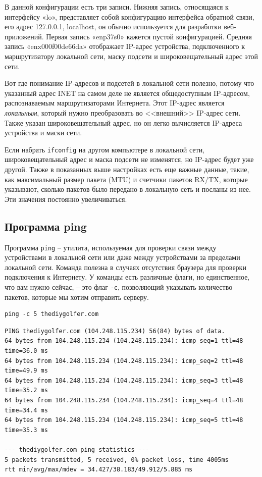 \documentclass[a4paper,12pt,final,openany]{extbook}
\begin{document}
В данной конфигурации есть три записи. Нижняя запись, относящаяся к
интерфейсу «lo», представляет собой конфигурацию интерфейса обратной
связи, его адрес 127.0.0.1, localhost, он обычно используется для
разработки веб-приложений. Первая запись «enp37s0» кажется пустой
конфигурацией. Средняя запись «enx000f00de66da» отображает IP-адрес
устройства, подключенного к маршрутизатору локальной сети, маску
подсети и широковещательный адрес этой сети.

Вот где понимание IP-адресов и
подсетей в локальной сети полезно, потому что указанный адрес INET на самом деле не является общедоступным IP-адресом, распознаваемым
маршрутизаторами Интернета. Этот IP-адрес является \emph{локальным},
который нужно преобразовать во <<внешний>> IP-адрес сети.
Также указан широковещательный адрес, но он легко
вычисляется IP-адреса устройства и маски сети.

Если набрать \texttt{ifconfig} на другом компьютере в локальной сети,
широковещательный адрес и маска подсети не изменятся, но IP-адрес будет уже
другой. Также в показанных выше настройках есть еще важные данные,
такие, как максимальный размер пакета (MTU)
и счетчики пакетов RX/TX, которые указывают, сколько пакетов было
передано в локальную сеть и посланы из нее. Эти значения постоянно
увеличиваться.

\hypertarget{ping}{%
\subsection{\texorpdfstring{\protect\hyperlink{ping}{}Программа
ping}{Программа ping}}\label{ping}}

Программа \texttt{ping} -- утилита, используемая для проверки
связи между устройствами в локальной сети или даже между устройствами за
пределами локальной сети. Команда полезна в случаях отсутствия браузера
для проверки подключения к Интернету. У команды есть различные флаги, но
единственное, что вам нужно сейчас, -- это флаг \texttt{-c},
позволяющий указывать количество пакетов, которые мы хотим отправить
серверу.
\begin{verbatim}
ping -c 5 thediygolfer.com
\end{verbatim}

\begin{verbatim}
PING thediygolfer.com (104.248.115.234) 56(84) bytes of data.
64 bytes from 104.248.115.234 (104.248.115.234): icmp_seq=1 ttl=48 time=36.0 ms
64 bytes from 104.248.115.234 (104.248.115.234): icmp_seq=2 ttl=48 time=49.9 ms
64 bytes from 104.248.115.234 (104.248.115.234): icmp_seq=3 ttl=48 time=35.2 ms
64 bytes from 104.248.115.234 (104.248.115.234): icmp_seq=4 ttl=48 time=34.4 ms
64 bytes from 104.248.115.234 (104.248.115.234): icmp_seq=5 ttl=48 time=35.3 ms

--- thediygolfer.com ping statistics ---
5 packets transmitted, 5 received, 0% packet loss, time 4005ms
rtt min/avg/max/mdev = 34.427/38.183/49.912/5.885 ms
\end{verbatim}
\end{document}
